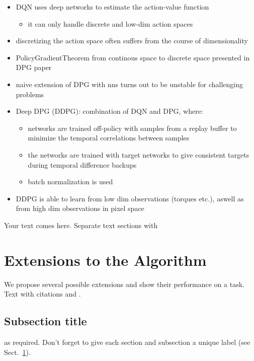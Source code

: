 \begin{itemize}
\item DQN uses deep networks to estimate the action-value function
\begin{itemize}
\item it can only handle discrete and low-dim action spaces
\end{itemize}
\item discretizing the action space often suffers from the course of dimensionality
\item PolicyGradientTheorem from continous space to discrete space presented in DPG paper
\item naive extension of DPG with nns turns out to be unstable for challenging problems
\item Deep DPG (DDPG): combination of DQN and DPG, where:
\begin{itemize}
\item networks are trained off-policy with samples from a replay buffer to minimize the temporal correlations between samples
\item the networks are trained with target networks to give consistent targets during temporal difference backups
\item batch normalization is used
\end{itemize}
\item DDPG is able to learn from low dim observations (torques etc.), aswell as from high dim observations in pixel space
\end{itemize}
Your text comes here. Separate text sections with


\section{Extensions to the Algorithm}
\label{sec:1}
We propose several possible extensions and show their performance on a task.\\
Text with citations \cite{RefB} and \cite{RefJ}.
\subsection{Subsection title}
\label{sec:2}
as required. Don't forget to give each section
and subsection a unique label (see Sect.~\ref{sec:1}).
